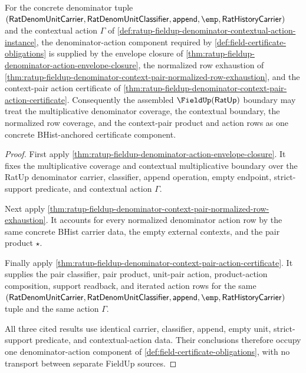 \begin{theorem}
\label{thm:ratup-fieldup-denominator-action-envelope-certificate-component}
For the concrete denominator tuple
$(\mathsf{RatDenomUnitCarrier},\mathsf{RatDenomUnitClassifier},\mathsf{append},\emp,\mathsf{RatHistoryCarrier})$
and the contextual action $\Gamma$ of
\autoref{def:ratup-fieldup-denominator-contextual-action-instance}, the
denominator-action component required by
\autoref{def:field-certificate-obligations} is supplied by the envelope closure
of \autoref{thm:ratup-fieldup-denominator-action-envelope-closure}, the
normalized row exhaustion of
\autoref{thm:ratup-fieldup-denominator-context-pair-normalized-row-exhaustion},
and the context-pair action certificate of
\autoref{thm:ratup-fieldup-denominator-context-pair-action-certificate}.
Consequently the assembled $\FieldUp(\mathsf{RatUp})$ boundary may treat the
multiplicative denominator coverage, the contextual boundary, the normalized
row coverage, and the context-pair product and action rows as one concrete
BHist-anchored certificate component.
\end{theorem}
\begin{proof}
First apply
\autoref{thm:ratup-fieldup-denominator-action-envelope-closure}. It fixes the
multiplicative coverage and contextual multiplicative boundary over the RatUp
denominator carrier, classifier, append operation, empty endpoint, strict-support
predicate, and contextual action $\Gamma$.

Next apply
\autoref{thm:ratup-fieldup-denominator-context-pair-normalized-row-exhaustion}.
It accounts for every normalized denominator action row by the same concrete
BHist carrier data, the empty external contexts, and the pair product $\star$.

Finally apply
\autoref{thm:ratup-fieldup-denominator-context-pair-action-certificate}. It
supplies the pair classifier, pair product, unit-pair action, product-action
composition, support readback, and iterated action rows for the same
$(\mathsf{RatDenomUnitCarrier},\mathsf{RatDenomUnitClassifier},\mathsf{append},\emp,\mathsf{RatHistoryCarrier})$
tuple and the same action $\Gamma$.

All three cited results use identical carrier, classifier, append, empty unit,
strict-support predicate, and contextual-action data. Their conclusions therefore
occupy one denominator-action component of
\autoref{def:field-certificate-obligations}, with no transport between separate
FieldUp sources.
\end{proof}

